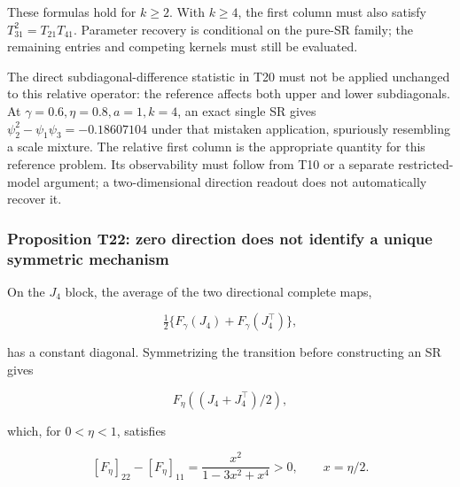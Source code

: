 \documentclass[11pt,a4paper]{article}
\begin{document}
These formulas hold for \(k\ge2\). With \(k\ge4\), the first column must
also satisfy \(T_{31}^2=T_{21}T_{41}\). Parameter recovery is
conditional on the pure-SR family; the remaining entries and competing
kernels must still be evaluated.

The direct subdiagonal-difference statistic in T20 must not be applied
unchanged to this relative operator: the reference affects both upper
and lower subdiagonals. At \(\gamma=0.6,\eta=0.8,a=1,k=4\), an exact
single SR gives \(\psi_2^2-\psi_1\psi_3=-0.18607104\) under that
mistaken application, spuriously resembling a scale mixture. The
relative first column is the appropriate quantity for this reference
problem. Its observability must follow from T10 or a separate
restricted-model argument; a two-dimensional direction readout does not
automatically recover it.

\subsubsection{Proposition T22: zero direction does not identify a
unique symmetric
mechanism}\label{proposition-t22-zero-direction-does-not-identify-a-unique-symmetric-mechanism}

\par
\noindent\begin{minipage}{\linewidth}

On the \(J_4\) block, the average of the two directional complete maps,

\[
\tfrac12\{F_\gamma(J_4)+F_\gamma(J_4^\top)\},
\]

\end{minipage}\par

\par
\noindent\begin{minipage}{\linewidth}

has a constant diagonal. Symmetrizing the transition before constructing
an SR gives

\[
F_\eta((J_4+J_4^\top)/2),
\]

\end{minipage}\par

\par
\noindent\begin{minipage}{\linewidth}

which, for \(0<\eta<1\), satisfies

\[
[F_\eta]_{22}-[F_\eta]_{11}
=\frac{x^2}{1-3x^2+x^4}>0,\qquad x=\eta/2.
\]

\end{minipage}\par
\end{document}
